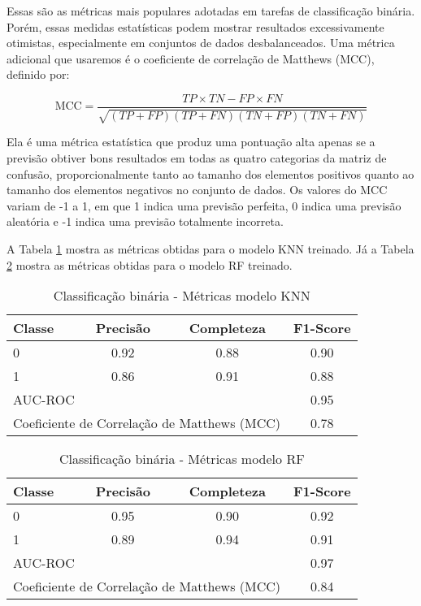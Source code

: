 Essas são as métricas mais populares adotadas em tarefas de classificação binária. Porém, essas medidas estatísticas podem mostrar resultados excessivamente otimistas, especialmente em conjuntos de dados desbalanceados. Uma métrica adicional que usaremos é o coeficiente de correlação de Matthews (MCC), definido por:

\begin{equation}
    \text{MCC} = \frac{TP \times TN - FP \times FN}{\sqrt{(TP + FP)(TP + FN)(TN + FP)(TN + FN)}}
\end{equation}

Ela é uma métrica estatística que produz uma pontuação alta apenas se a previsão obtiver bons resultados em todas as quatro categorias da matriz de confusão, proporcionalmente tanto ao tamanho dos elementos positivos quanto ao tamanho dos elementos negativos no conjunto de dados. Os valores do MCC variam de -1 a 1, em que 1 indica uma previsão perfeita, 0 indica uma previsão aleatória e -1 indica uma previsão totalmente incorreta.

A Tabela \ref{metricas_modelo_knn} mostra as métricas obtidas para o modelo KNN treinado. Já a Tabela \ref{metricas_modelo_rf} mostra as métricas obtidas para o modelo RF treinado.

\begin{table}[!ht]
    \centering
    \caption{Classificação binária - Métricas modelo KNN}
    \begin{tabular}{lccc}
        \toprule
        Classe & Precisão & Completeza & F1-Score \\
        \midrule
        0 & 0.92 & 0.88 & 0.90 \\
        1 & 0.86 & 0.91 & 0.88 \\
        \midrule
        \multicolumn{3}{l}{AUC-ROC} & 0.95 \\
        \multicolumn{3}{l}{Coeficiente de Correlação de Matthews (MCC)} & 0.78 \\
        \bottomrule
    \end{tabular}
    \label{metricas_modelo_knn}
\end{table}


\begin{table}[!ht]
    \centering
    \caption{Classificação binária - Métricas modelo RF}
    \begin{tabular}{lccc}
        \toprule
        Classe & Precisão & Completeza & F1-Score \\
        \midrule
        0 & 0.95 & 0.90 & 0.92 \\
        1 & 0.89 & 0.94 & 0.91 \\
        \midrule
        \multicolumn{3}{l}{AUC-ROC} & 0.97 \\
        \multicolumn{3}{l}{Coeficiente de Correlação de Matthews (MCC)} & 0.84 \\
        \bottomrule
    \end{tabular}
    \label{metricas_modelo_rf}
\end{table}

